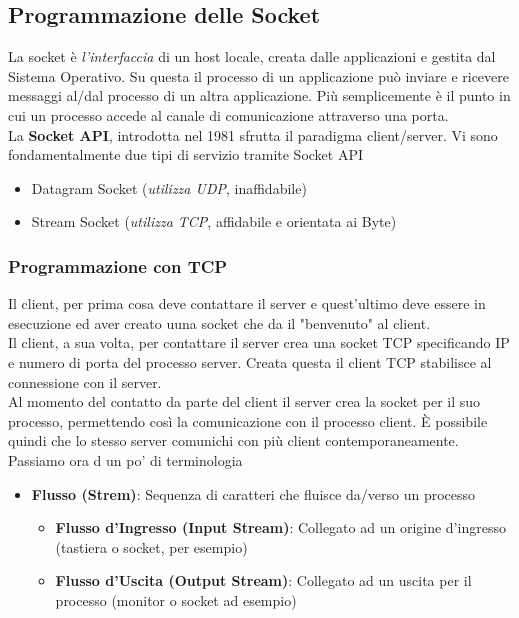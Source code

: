 \documentclass{article}
\begin{document}
        \subsection{Programmazione delle Socket}
            La socket è \textit{l'interfaccia} di un host locale, creata dalle applicazioni e gestita dal Sistema Operativo. Su questa il processo di un applicazione può inviare e ricevere messaggi al/dal processo di un altra applicazione. Più semplicemente è il punto in cui un processo accede al canale di comunicazione attraverso una porta.\\
            La \textbf{Socket API}, introdotta nel 1981 sfrutta il paradigma client/server. Vi sono fondamentalmente due tipi di servizio tramite Socket API
            \begin{itemize}
                \item Datagram Socket (\textit{utilizza UDP}, inaffidabile)
                \item Stream Socket (\textit{utilizza TCP}, affidabile e orientata ai Byte)
            \end{itemize} 

            \subsubsection{Programmazione con TCP}
                Il client, per prima cosa deve contattare il server e quest'ultimo deve essere in esecuzione ed aver creato uuna socket che da il "benvenuto" al client.\\
                Il client, a sua volta, per contattare il server crea una socket TCP specificando IP e numero di porta del processo server. Creata questa il client TCP stabilisce al connessione con il server.\\
                Al momento del contatto da parte del client il server crea la socket per il suo processo, permettendo così la comunicazione con il processo client. È possibile quindi che lo stesso server comunichi con più client contemporaneamente.\\
                Passiamo ora d un po' di terminologia
                \begin{itemize}
                    \item \textbf{Flusso (Strem)}: Sequenza di caratteri che fluisce da/verso un processo
                          \begin{itemize}
                              \item \textbf{Flusso d'Ingresso (Input Stream)}: Collegato ad un origine d'ingresso (tastiera o socket, per esempio)
                              \item \textbf{Flusso d'Uscita (Output Stream)}: Collegato ad un uscita per il processo (monitor o socket ad esempio)
                          \end{itemize} 
                \end{itemize}
\end{document}
